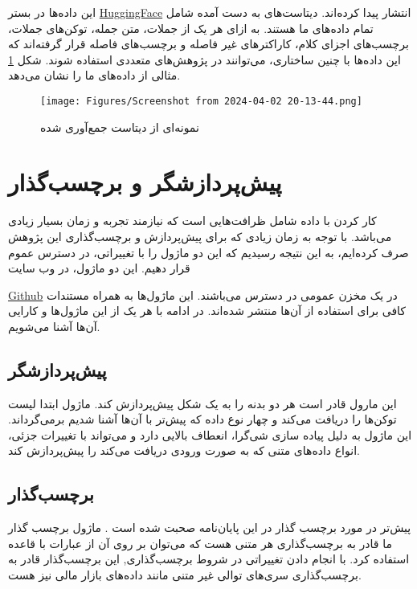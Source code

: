   این داده‌ها در بستر \hyperlink{https://huggingface.co/PerSpaCor}{HuggingFace} انتشار پیدا کرده‌اند. دیتاست‌های به دست آمده شامل تمام داده‌های ما هستند. به ازای هر یک از جملات، متن جمله، توکن‌های جملات، برچسب‌های اجزای کلام، کاراکتر‌های غیر فاصله و برچسب‌های فاصله قرار گرفته‌اند که این داده‌ها با چنین ساختاری، می‌توانند در پژوهش‌های متعددی استفاده شوند. شکل \ref{fig:dataset_preview} مثالی از داده‌های ما را نشان می‌دهد.
\begin{figure}[H]
      \centering
      \texttt{[image: Figures/Screenshot from 2024-04-02 20-13-44.png]}
      \caption{ نمونه‌ای از دیتاست جمع‌آوری شده}
      \label{fig:dataset_preview}
  \end{figure}




\section{پیش‌پردازشگر و برچسب‌گذار}
\hspace{30pt}
کار کردن با داده شامل ظرافت‌هایی است که نیازمند تجربه و زمان بسیار زیادی می‌باشد. با توجه به زمان زیادی که برای پیش‌پردازش و برچسب‌گذاری این پژوهش صرف کرده‌ایم، به این نتیجه رسیدیم که این دو ماژول را با تغییراتی، در دسترس عموم قرار‌ دهیم. این دو ماژول، در وب سایت

\hyperlink{https://github.com/MatinEbrahimkhani/PerSpaCor_components}{Github}   در یک مخزن عمومی در دسترس می‌باشند. این ماژول‌ها به همراه مستندات کافی برای استفاده از آن‌ها منتشر شده‌اند. در ادامه با هر  یک از این ماژول‌ها و کارایی آن‌ها آشنا می‌شویم.

\subsection{پیش‌پردازشگر}
\hspace{30pt}
این مارول قادر است هر دو بدنه را به یک شکل پیش‌پردازش کند. ماژول ابتدا لیست توکن‌ها را دریافت می‌کند و چهار نوع داده که پیش‌تر با آن‌ها آشنا شدیم بر‌می‌گرداند. این ماژول به دلیل پیاده سازی شی‌گرا، انعطاف بالایی دارد و می‌تواند با تغییرات جزئی، انواع داده‌های متنی که به صورت ورودی دریافت می‌کند را پیش‌پردازش کند.

\subsection{برچسب‌گذار}
\hspace{30pt}
پیش‌تر در مورد برچسب گذار در این پایان‌نامه صحبت شده است . ماژول برچسب گذار ما قادر به برچسب‌گذاری هر متنی هست که می‌توان بر روی آن از عبارات با قاعده استفاده کرد. با انجام دادن تغییراتی در شروط برچسب‌گذاری, این برچسب‌گذار قادر به برچسب‌گذاری سری‌های توالی غیر متنی مانند داده‌های بازار مالی نیز هست.


